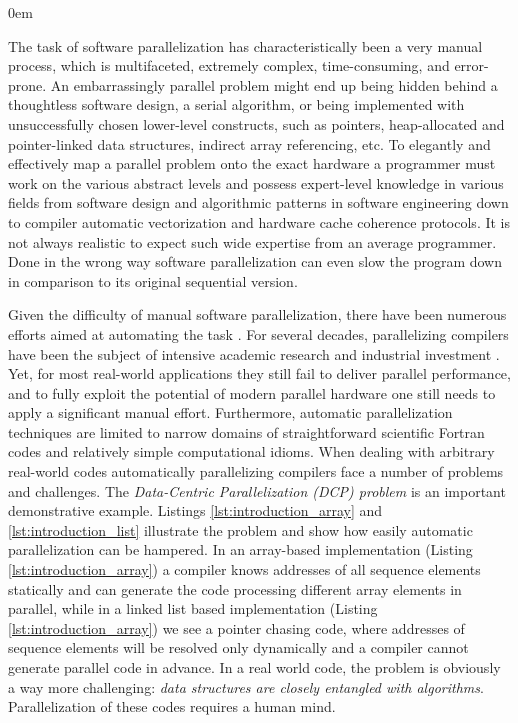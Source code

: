 \begin{description}[style=unboxed,leftmargin=0cm]
\itemsep0em
\item[\textit{Manual parallelization challenges}] The task of software parallelization has characteristically been a very manual process, which is multifaceted, extremely complex, time-consuming, and error-prone. An embarrassingly parallel problem might end up being hidden behind a thoughtless software design, a serial algorithm, or being implemented with unsuccessfully chosen lower-level constructs, such as pointers, heap-allocated and pointer-linked data structures, indirect array referencing, etc. To elegantly and effectively map a parallel problem onto the exact hardware a programmer must work on the various abstract levels and possess expert-level knowledge in various fields from software design and algorithmic patterns in software engineering down to compiler automatic vectorization and hardware cache coherence protocols. It is not always realistic to expect such wide expertise from an average programmer. Done in the wrong way software parallelization can even slow the program down in comparison to its original sequential version.
\item[\textit{Automatic parallelization limitations}] Given the difficulty of manual software parallelization, there have been numerous efforts aimed at automating the task \cite{Bacon:1994:CTH:197405.197406}. For several decades, parallelizing compilers have been the subject of intensive academic research \cite{6813266} and industrial investment \cite{icc-compiler}. Yet, for most real-world applications they still fail to deliver parallel performance, and to fully exploit the potential of modern parallel hardware one still needs to apply a significant manual effort. Furthermore, automatic parallelization techniques are limited to narrow domains of straightforward scientific Fortran codes and relatively simple computational idioms. When dealing with arbitrary real-world codes automatically parallelizing compilers face a number of problems and challenges. The \textit{Data-Centric Parallelization (DCP) problem} is an important demonstrative example. Listings \ref{lst:introduction_array} and \ref{lst:introduction_list} illustrate the problem and show how easily automatic parallelization can be hampered. In an array-based implementation (Listing \ref{lst:introduction_array}) a compiler knows addresses of all sequence elements statically and can generate the code processing different array elements in parallel, while in a linked list based implementation (Listing \ref{lst:introduction_array}) we see a pointer chasing code, where addresses of sequence elements will be resolved only dynamically and a compiler cannot generate parallel code in advance. In a real world code, the problem is obviously a way more challenging: \textit{data structures are closely entangled with algorithms}. Parallelization of these codes requires a human mind.\newline\null

\end{description}
